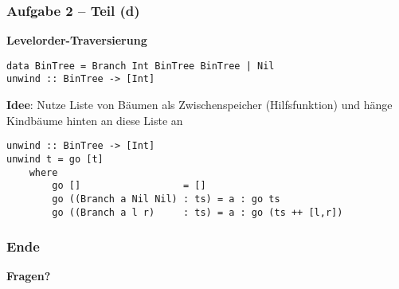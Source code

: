 \documentclass{beamer}
\begin{document}
\begin{frame}[fragile] \frametitle{Aufgabe 2 -- Teil (d)}
	\small
	\textbf{Levelorder-Traversierung}
	
	\begin{lstlisting}[style=bg]
data BinTree = Branch Int BinTree BinTree | Nil 
unwind :: BinTree -> [Int]
	\end{lstlisting}
	\smallskip \pause
	
	\textbf{Idee}: Nutze Liste von Bäumen als Zwischenspeicher (Hilfsfunktion) und hänge Kindbäume hinten an diese Liste an
	\bigskip \pause
	
	\begin{lstlisting}[style=bg, tabsize=1]
unwind :: BinTree -> [Int]
unwind t = go [t]
	where
		go []                  = []
		go ((Branch a Nil Nil) : ts) = a : go ts
		go ((Branch a l r)     : ts) = a : go (ts ++ [l,r])
	\end{lstlisting}
\end{frame}

\begin{frame} \frametitle{Ende}
	\centering
	\textbf{Fragen?}
\end{frame}
\end{document}
